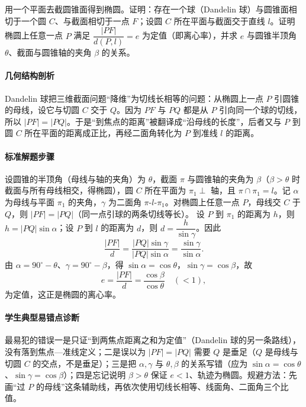 \begin{problem}
用一个平面去截圆锥面得到椭圆。证明：存在一个球（Dandelin 球）与圆锥面相切于一个圆 $C$、与截面相切于一点 $F$；设圆 $C$ 所在平面与截面交于直线 $l$。证明椭圆上任意一点 $P$ 满足 $\dfrac{|PF|}{d(P,l)}=e$ 为定值（即离心率），并求 $e$ 与圆锥半顶角 $\theta$、截面与圆锥轴的夹角 $\beta$ 的关系。
\end{problem}
\begin{solution}
\paragraph{几何结构剖析}
Dandelin 球把三维截面问题“降维”为切线长相等的问题：从椭圆上一点 $P$ 引圆锥的母线，设它与切圆 $C$ 交于 $Q$。因为 $PF$ 与 $PQ$ 都是从 $P$ 引向同一个球的切线，所以 $|PF|=|PQ|$。于是“到焦点的距离”被翻译成“沿母线的长度”，后者又与 $P$ 到圆 $C$ 所在平面的距离成正比，再经二面角转化为 $P$ 到准线 $l$ 的距离。
\paragraph{标准解题步骤}
设圆锥的半顶角（母线与轴的夹角）为 $\theta$，截面 $\pi$ 与圆锥轴的夹角为 $\beta$（$\beta>\theta$ 时截面与所有母线相交，得椭圆），圆 $C$ 所在平面为 $\pi_1\perp$ 轴，且 $\pi\cap\pi_1=l$。记 $\alpha$ 为母线与平面 $\pi_1$ 的夹角，$\gamma$ 为二面角 $\pi$-$l$-$\pi_1$。对椭圆上任意一点 $P$，母线交 $C$ 于 $Q$，则
$|PF|=|PQ|$（同一点引球的两条切线等长）。
设 $P$ 到 $\pi_1$ 的距离为 $h$，则 $h=|PQ|\sin\alpha$；设 $P$ 到 $l$ 的距离为 $d$，则 $d=\dfrac{h}{\sin\gamma}$。因此
$$\frac{|PF|}{d}=\frac{|PQ|\sin\gamma}{|PQ|\sin\alpha}=\frac{\sin\gamma}{\sin\alpha}.$$
由 $\alpha=90^\circ-\theta$、$\gamma=90^\circ-\beta$，得 $\sin\alpha=\cos\theta$，$\sin\gamma=\cos\beta$，故
$$e=\frac{|PF|}{d}=\frac{\cos\beta}{\cos\theta}\quad(<1),$$
为定值，这正是椭圆的离心率。
\paragraph{学生典型易错点诊断}
最易犯的错误一是只证“到两焦点距离之和为定值”（Dandelin 球的另一条路线），没有落到焦点—准线定义；二是误以为 $|PF|=|PQ|$ 需要 $Q$ 是垂足（$Q$ 是母线与切圆 $C$ 的交点，不是垂足）；三是把 $\alpha,\gamma$ 与 $\theta,\beta$ 的关系写错（应为 $\sin\alpha=\cos\theta$、$\sin\gamma=\cos\beta$）；四是忘记说明 $\beta>\theta$ 保证 $e<1$、轨迹为椭圆。规避方法：先画“过 $P$ 的母线”这条辅助线，再依次使用切线长相等、线面角、二面角三个比值。
\end{solution}

